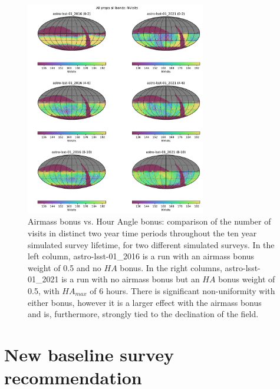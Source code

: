 \documentclass[DM,lsstdraft,authoryear,toc]{lsstdoc}
\begin{document}
\begin{figure}[ht]
\centering
\includegraphics[width=0.7\textwidth]{figures/nvisits_comp_maps}
\caption{Airmass bonus vs. Hour Angle bonus: comparison of the number of visits in distinct two year time periods throughout the ten year simulated survey lifetime, for two different simulated surveys. In the left column, astro-lsst-01\_2016 is a run with an airmass bonus weight of 0.5 and no $HA$ bonus. In the right columns, astro-lsst-01\_2021 is a run with no airmass bonus but an $HA$ bonus weight of 0.5, with $HA_{max}$ of 6 hours. There is significant non-uniformity with either bonus, however it is a larger effect with the airmass bonus and is, furthermore, strongly tied to the declination of the field.
\label{fig:nvisits_comp_maps}}
\end{figure}


\section{New baseline survey recommendation}
\end{document}

